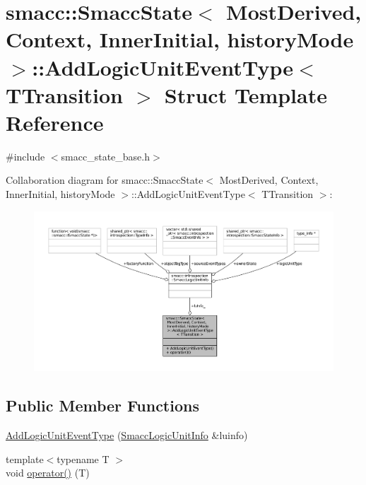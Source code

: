 \hypertarget{structsmacc_1_1SmaccState_1_1AddLogicUnitEventType}{}\section{smacc\+:\+:Smacc\+State$<$ Most\+Derived, Context, Inner\+Initial, history\+Mode $>$\+:\+:Add\+Logic\+Unit\+Event\+Type$<$ T\+Transition $>$ Struct Template Reference}
\label{structsmacc_1_1SmaccState_1_1AddLogicUnitEventType}


{\ttfamily \#include $<$smacc\+\_\+state\+\_\+base.\+h$>$}



Collaboration diagram for smacc\+:\+:Smacc\+State$<$ Most\+Derived, Context, Inner\+Initial, history\+Mode $>$\+:\+:Add\+Logic\+Unit\+Event\+Type$<$ T\+Transition $>$\+:
\nopagebreak
\begin{figure}[H]
\begin{center}
\leavevmode
\includegraphics[width=350pt]{structsmacc_1_1SmaccState_1_1AddLogicUnitEventType__coll__graph}
\end{center}
\end{figure}
\subsection*{Public Member Functions}
\begin{DoxyCompactItemize}
\item 
\hyperlink{structsmacc_1_1SmaccState_1_1AddLogicUnitEventType_a056b0caaa1a419fecfb36eccc42e9aa6}{Add\+Logic\+Unit\+Event\+Type} (\hyperlink{structsmacc_1_1introspection_1_1SmaccLogicUnitInfo}{Smacc\+Logic\+Unit\+Info} \&luinfo)
\item 
{\footnotesize template$<$typename T $>$ }\\void \hyperlink{structsmacc_1_1SmaccState_1_1AddLogicUnitEventType_a8ed7e96e4922fbc8097a6ff078d70150}{operator()} (T)
\end{DoxyCompactItemize}
